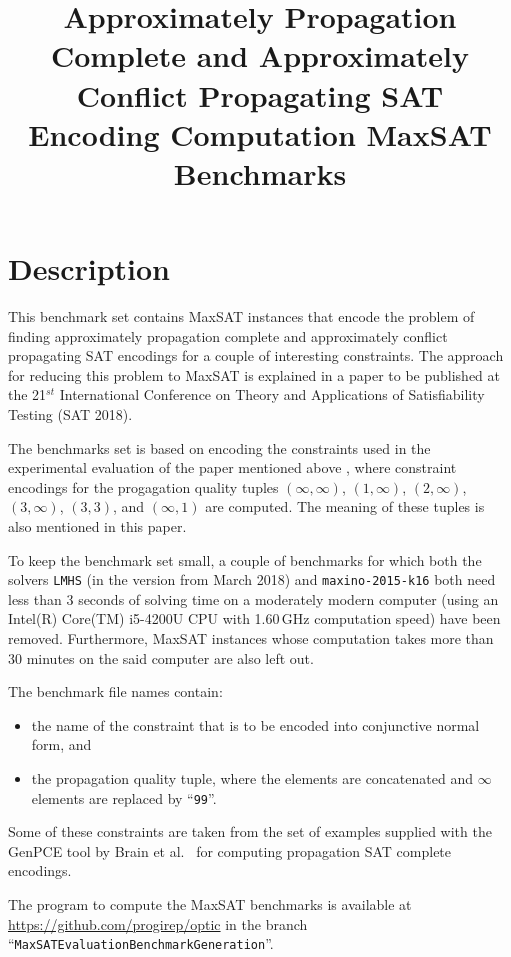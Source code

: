 \documentclass[a4paper,10pt]{IEEEtran}
\author{\IEEEauthorblockN{R\"udiger Ehlers \\}
\IEEEauthorblockA{University of Bremen \& DFKI GmbH\\
Germany
}}
\begin{document}
\title{Approximately Propagation Complete and Approximately Conflict Propagating SAT Encoding Computation MaxSAT Benchmarks}
\maketitle

\section{Description}
This benchmark set contains MaxSAT instances that encode the problem of finding approximately propagation complete and approximately conflict propagating SAT encodings for a couple of interesting constraints. The approach for reducing this problem to MaxSAT is explained in a paper \cite{EP2018} to be published at the 21$^\mathit{st}$ International Conference on Theory and Applications of Satisfiability Testing (SAT 2018).

The benchmarks set is based on encoding the constraints used in the experimental evaluation of the paper mentioned above , where constraint encodings for the progagation quality tuples $(\infty,\infty)$, $(1,\infty)$, $(2,\infty)$, $(3,\infty)$, $(3,3)$, and $(\infty,1)$ are computed. The meaning of these tuples is also mentioned in this paper. 

To keep the benchmark set small, a couple of benchmarks for which both the solvers \texttt{LMHS} \cite{DBLP:conf/sat/SaikkoBJ16} (in the version from March 2018) and \texttt{maxino-2015-k16} \cite{DBLP:conf/ijcai/AlvianoDR15} both need less than 3 seconds of solving time on a moderately modern computer (using an Intel(R) Core(TM) i5-4200U CPU with 1.60\,GHz computation speed) have been removed. Furthermore, MaxSAT instances whose computation takes more than 30 minutes on the said computer are also left out.

The benchmark file names contain:
\begin{itemize}
\item the name of the constraint that is to be encoded into conjunctive normal form, and
\end{itemize}
\newpage
\begin{itemize}
\item the propagation quality tuple, where the elements are concatenated and $\infty$ elements are replaced by ``\texttt{99}''.
\end{itemize}
Some of these constraints are taken from the set of examples supplied with the GenPCE tool by Brain et al.~\cite{DBLP:conf/vmcai/BrainHKM16} for computing propagation SAT complete encodings.

The program to compute the MaxSAT benchmarks is available at \url{https://github.com/progirep/optic} in the branch ``\texttt{MaxSATEvaluationBenchmarkGeneration}''.



\end{document}
